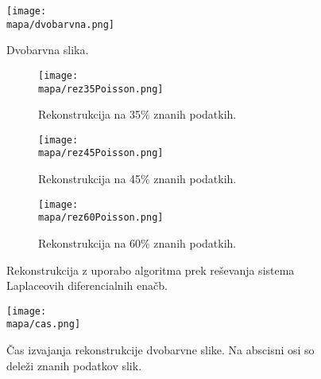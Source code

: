 \renewcommand{\mapa}{Poglavja/Slike/dvobarvna}

\begin{figure}[!ht]
    \centering
    \texttt{[image: \\mapa/dvobarvna.png]}
    \caption{Dvobarvna slika.}
\end{figure}

\begin{figure}[!ht]
    \begin{subfigure}{0.32\linewidth}
        \texttt{[image: \\mapa/rez35Poisson.png]}
        \caption{Rekonstrukcija na 35\% znanih podatkih.}
    \end{subfigure}
    \hfill
    \begin{subfigure}{0.32\linewidth}
        \texttt{[image: \\mapa/rez45Poisson.png]}
        \caption{Rekonstrukcija na 45\% znanih podatkih.}
    \end{subfigure}
    \hfill
    \begin{subfigure}{0.32\linewidth}
        \texttt{[image: \\mapa/rez60Poisson.png]}
        \caption{Rekonstrukcija na 60\% znanih podatkih.}
    \end{subfigure}
    \caption{Rekonstrukcija z uporabo algoritma prek reševanja sistema Laplaceovih diferencialnih enačb.}
\end{figure}
\clearpage

\begin{figure}[H]
    \centering
    \texttt{[image: \\mapa/cas.png]}
    \caption{Čas izvajanja rekonstrukcije dvobarvne slike. Na abscisni osi so deleži znanih podatkov slik.}
\end{figure}